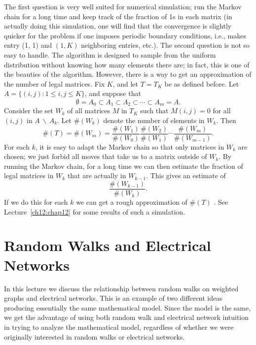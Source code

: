 \documentclass{stml-l}
\theoremstyle{definition}
\numberwithin{equation}{chapter}
\numberwithin{figure}{chapter}
\numberwithin{figure}{section}
\begin{document}
The first question is very well suited for numerical simulation; run
the Markov chain for a long time and keep track of the fraction of
1s in each matrix (in actually doing this simulation, one will find
that the convergence is slightly quicker for the problem if one
imposes periodic boundary conditions, i.e., makes entry (1, 1) and
$(1,K)$ neighboring entries, etc.). The second question is not so
easy to handle. The algorithm is designed to sample from the uniform
distribution without knowing how many elements there are; in fact,
this is one of the beauties of the algorithm. However, there is a
way to get an approximation of the number of legal matrices. Fix
$K$, and let $T=T_{K}$ be as defined before. Let $A=\{(i,j):1\leq
i,j\leq K\}$, and suppose that
\begin{equation*}
\emptyset=A_{0}\subset A_{1}\subset A_{2}\subset\cdots\subset A_{m}=A.
\end{equation*}
Consider the set $W_{k}$ of all matrices $M$ in $T_{K}$ such that
$M(i,j)=0$ for all $(i,j)$ in $A\,\backslash\,A_{k}$. Let $\#(W_{k})$
denote the number of elements in $W_{k}$. Then
\begin{equation*}
\#(T)=\#(W_{m})=\frac{\#(W_{1})}{\#(W_{0})}\frac{\#(W_{2})}{\#(W_{1})}\cdots\frac{\#(W_{m})}{\#(W_{m-1})}.
\end{equation*}
For each $k$, it is easy to adapt the Markov chain so that only
matrices in $W_{k}$ are chosen; we just forbid all moves that take
us to a matrix outside of $W_{k}$. By running the Markov chain, for
a long time we can then estimate the fraction of legal matrices in
$W_{k}$ that are actually in $W_{k-1}$. This gives an estimate of
\begin{equation*}
\frac{\#(W_{k-1})}{\#(W_{k})}.
\end{equation*}
If we do this for each $k$ we can get a rough approximation of
$\#(T)$ . See Lecture~\ref{ch12:chap12} for some results of such a
simulation.



\chapter{Random Walks and Electrical Networks\label{ch09:chap09}}

In this lecture we discuss the relationship between random walks on
weighted graphs and electrical networks. This is an example of two
different ideas producing essentially the same mathematical model.
Since the model is the same, we get the advantage of using both
random walk and electrical network intuition in trying to analyze
the mathematical model, regardless of whether we were originally
interested in random walks or electrical networks.
\end{document}
